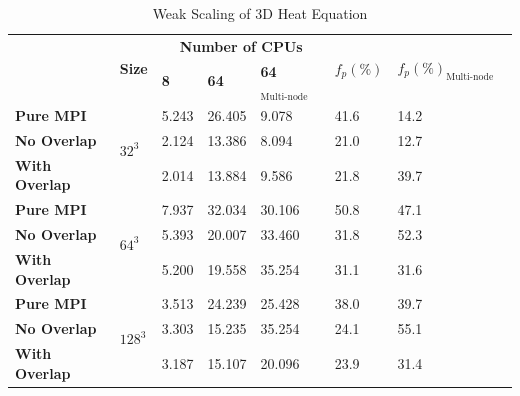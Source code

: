 \begin{table}[htbp]
  \caption{Weak Scaling of 3D Heat Equation}
  \label{TAB:Benchmark:Weak_3D_AllModels}
  \begin{minipage}{\columnwidth}
    \begin{center}
      \footnotesize %
      \begin{tabular}{>{\bfseries}p{2.5cm} p{1cm} p{1.5cm} p{1.5cm} p{1.5cm} p{1.5cm} p{1cm} p{1cm}}
        \toprule
        \multirow{2}{*}{Strategy} & \multirow{2}{*}{\bfseries Size} & \multicolumn{3}{c}{\bfseries  Number of CPUs}    & \multirow{2}{*}{\bfseries $f_p(\%)$}  & \multirow{2}{*}{\bfseries $f_p(\%)_{\text{Multi-node}}$}\\
                      &                      & \bfseries 8     & \bfseries 64        & \bfseries 64$_{\text{Multi-node}}$   &  &  &         \\
        \midrule
        Pure MPI      & \multirow{3}{*}{$32^3$}       & 5.243  & 26.405              &  9.078                     & 41.6 & 14.2 \\
        No Overlap    &                               & 2.124  & 13.386              &  8.094                     & 21.0 &  12.7\\
        With Overlap  &                               & 2.014  & 13.884              &  9.586                     & 21.8 & 39.7 \\
        \midrule
        Pure MPI      & \multirow{3}{*}{$64^3$}       & 7.937  & 32.034              &  30.106                    & 50.8 & 47.1 \\
        No Overlap    &                               & 5.393  & 20.007              &  33.460                    & 31.8 & 52.3 \\
        With Overlap  &                               & 5.200  & 19.558              &  35.254                    & 31.1 & 31.6 \\
        \midrule
        Pure MPI      & \multirow{3}{*}{$128^3$}      & 3.513  & 24.239              &  25.428                    & 38.0 & 39.7 \\
        No Overlap    &                               & 3.303  & 15.235              &  35.254                    & 24.1 & 55.1 \\
        With Overlap  &                               & 3.187  & 15.107              &  20.096                    & 23.9 & 31.4 \\
        \bottomrule
      \end{tabular}
    \end{center}
  \end{minipage}
\end{table}

